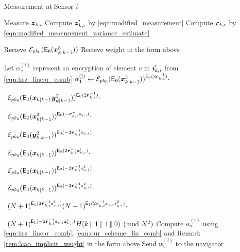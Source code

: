 \documentclass[10pt,letterpaper,oneside,twocolumn,journal]{IEEEtran}
\theoremstyle{definition}
\theoremstyle{definition}
\theoremstyle{remark}
\begin{document}
\begin{algorithm}[htbp]
\caption{Measurement at Sensor $i$}\label{alg:measurement_info}
\begin{algorithmic}[1]

    \State Measure ${\boldsymbol{z}}_{k,i}$
    \State Compute ${\boldsymbol{z}}_{k,i}'$ by \eqref{eqn:modified_measurement}
    \State Compute ${\boldsymbol{r}}_{k, i}$ by \eqref{eqn:modified_measurement_variance_estimate}

    \State Recieve $\mathcal{E}_{pk_0}(\mathsf{E}_{0}({\boldsymbol{x}}^3_{k|k-1}))$
        \State Recieve weight in the form above
    \EndFor

    \State Let $\alpha_{v}^{(i)}$ represent an encryption of element $v$ in ${\boldsymbol{\underline{i}}}'_{k,i}$ from \eqref{eqn:hrz_linear_comb}
    \State $\alpha_{1}^{(i)} \gets \mathcal{E}_{pk_0}(\mathsf{E}_{0}({\boldsymbol{x}}^3_{k|k-1}))^{\mathsf{E}_{0}(2{\boldsymbol{r}}_{k, i}^{-1})}\cdot$\par
    \ $\mathcal{E}_{pk_0}(\mathsf{E}_{0}({\boldsymbol{x}}_{k|k-1}{\boldsymbol{y}}^2_{k|k-1}))^{\mathsf{E}_{0}(2{\boldsymbol{r}}_{k, i}^{-1})}\cdot$\par
    \ $\mathcal{E}_{pk_0}(\mathsf{E}_{0}({\boldsymbol{x}}^2_{k|k-1}))^{\mathsf{E}_{0}(-{\boldsymbol{r}}_{k, i}^{-1}s_{x,i})}\cdot$\par
    \ $\mathcal{E}_{pk_0}(\mathsf{E}_{0}({\boldsymbol{y}}^2_{k|k-1}))^{\mathsf{E}_{0}(-2{\boldsymbol{r}}_{k, i}^{-1}s_{x,i})}\cdot$\par
    \ $\mathcal{E}_{pk_0}(\mathsf{E}_{0}({\boldsymbol{x}}_{k|k-1}))^{\mathsf{E}_{0}(2{\boldsymbol{r}}_{k, i}^{-1}{\boldsymbol{z}}_{k,i}')}\cdot$\par
    \ $\mathcal{E}_{pk_0}(\mathsf{E}_{0}({\boldsymbol{x}}_{k|k-1}))^{\mathsf{E}_{0}(-2{\boldsymbol{r}}_{k, i}^{-1}s_{x,i}^2)}\cdot$\par
    \ $\mathcal{E}_{pk_0}(\mathsf{E}_{0}({\boldsymbol{x}}_{k|k-1}))^{\mathsf{E}_{0}(-2{\boldsymbol{r}}_{k, i}^{-1}s_{y,i}^2)}\cdot$\par
    \ $(N+1)^{\mathsf{E}_{1}(2{\boldsymbol{r}}_{k, i}^{-1}s_{x,i}^3)}
    (N+1)^{\mathsf{E}_{1}(2{\boldsymbol{r}}_{k, i}^{-1}s_{x,i}s_{y,i}^2)}\cdot$\par
    \ $(N+1)^{\mathsf{E}_{1}(-2{\boldsymbol{r}}_{k, i}^{-1}s_{x,i}{\boldsymbol{z}}_{k,i}')}
    H(k\mathbin\|1\mathbin\|1\mathbin\|0)\pmod{N^2}$
    \State Compute $\alpha_{2}^{(i)}$ using \eqref{eqn:hrz_linear_comb}, \eqref{eqn:our_scheme_lin_comb} and Remark \ref{rem:lcao_implicit_weight} in the form above
        \State Send $\alpha_{v}^{(i)}$ to the navigator
    \EndFor


\end{algorithmic}
\end{algorithm}
\end{document}
